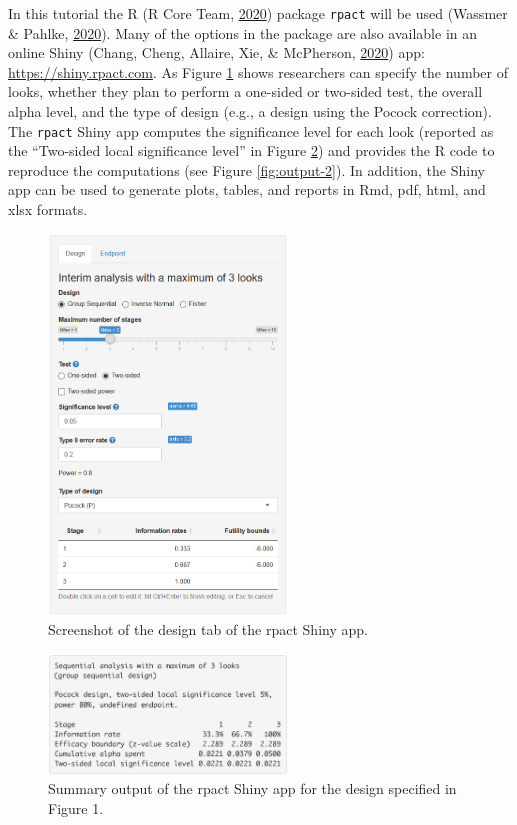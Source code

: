 \documentclass[
  english,
  ,man,floatsintext]{apa6}
\begin{document}
In this tutorial the R (R Core Team, \protect\hyperlink{ref-r_2020}{2020}) package \texttt{rpact} will be used (Wassmer \& Pahlke, \protect\hyperlink{ref-wassmer_rpact_2019}{2020}). Many of the options in the package are also available in an online Shiny (Chang, Cheng, Allaire, Xie, \& McPherson, \protect\hyperlink{ref-shiny_app_2020}{2020}) app: \url{https://shiny.rpact.com}. As Figure \ref{fig:screenshot-1} shows researchers can specify the number of looks, whether they plan to perform a one-sided or two-sided test, the overall alpha level, and the type of design (e.g., a design using the Pocock correction). The \texttt{rpact} Shiny app computes the significance level for each look (reported as the ``Two-sided local significance level'' in Figure \ref{fig:output-1}) and provides the R code to reproduce the computations (see Figure \ref{fig:output-2}). In addition, the Shiny app can be used to generate plots, tables, and reports in Rmd, pdf, html, and xlsx formats.

\begin{figure}
\includegraphics[width=240px]{seq_images/rpact_2} \caption{Screenshot of the design tab of the rpact Shiny app.}\label{fig:screenshot-1}
\end{figure}

\begin{figure}
\includegraphics[width=240px]{seq_images/output_1} \caption{Summary output of the rpact Shiny app for the design specified in Figure 1.}\label{fig:output-1}
\end{figure}
\end{document}
